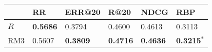 \begin{tabular}{llllll}
\toprule
{} &               RR &           ERR@20 &                   R@20 &             NDCG &                    RBP \\
\midrule
$R$               &           \textbf{0.5686} &           0.3794 &                   0.4600 &           0.4613 &                 0.3113 \\
RM3               &           0.5607 &           \textbf{0.3809} &                 \textbf{0.4716} &           \textbf{0.4636} &  \textbf{0.3215}$^{*}$ \\
\bottomrule
\end{tabular}
